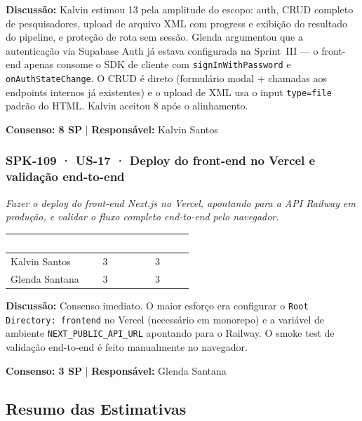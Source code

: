 \documentclass[12pt,a4paper]{article}
\begin{document}
\vspace{0.2cm}
\textbf{Discussão:} Kalvin estimou 13 pela amplitude do escopo: auth, CRUD completo de pesquisadores,
upload de arquivo XML com progress e exibição do resultado do pipeline, e proteção de rota sem sessão.
Glenda argumentou que a autenticação via Supabase Auth já estava configurada na Sprint~III — o front-end
apenas consome o SDK de cliente com \texttt{signInWithPassword} e \texttt{onAuthStateChange}. O CRUD é
direto (formulário modal + chamadas aos endpoints internos já existentes) e o upload de XML usa o input
\texttt{type=file} padrão do HTML. Kalvin aceitou 8 após o alinhamento.

\textbf{Consenso: 8 SP} \quad | \quad \textbf{Responsável:} Kalvin Santos

\subsubsection{SPK-109 · US-17 · Deploy do front-end no Vercel e validação end-to-end}

\textit{Fazer o deploy do front-end Next.js no Vercel, apontando para a API Railway em produção,
e validar o fluxo completo end-to-end pelo navegador.}

\vspace{0.3cm}
\begin{tabular}{lcc}
  \toprule
  \rowcolor{sparkblue}
  \textcolor{white}{\textbf{Participante}} &
  \textcolor{white}{\textbf{Voto 1}} &
  \textcolor{white}{\textbf{Voto Final}} \\
  \midrule
  Kalvin Santos  & 3 & 3 \\
  Glenda Santana & 3 & 3 \\
  \bottomrule
\end{tabular}

\vspace{0.2cm}
\textbf{Discussão:} Consenso imediato. O maior esforço era configurar o \texttt{Root Directory: frontend}
no Vercel (necessário em monorepo) e a variável de ambiente \texttt{NEXT\_PUBLIC\_API\_URL} apontando para
o Railway. O smoke test de validação end-to-end é feito manualmente no navegador.

\textbf{Consenso: 3 SP} \quad | \quad \textbf{Responsável:} Glenda Santana

\subsection{Resumo das Estimativas}
\end{document}
